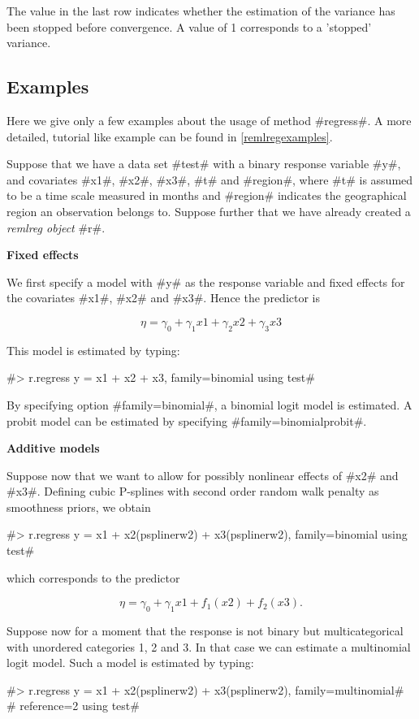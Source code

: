 The value in the last row indicates whether the estimation of the
variance has been stopped before convergence. A value of 1
corresponds to a 'stopped' variance.

\subsection{Examples}

Here we give only a few examples about the usage of method
#regress#. A more detailed, tutorial like example can be found in
\autoref{remlregexamples}.

Suppose that we have a data set #test# with a binary response
variable #y#, and covariates #x1#, #x2#, #x3#, #t# and #region#,
where #t# is assumed to be a time scale measured in months and
#region# indicates the geographical region an observation belongs
to. Suppose further that we have already created a {\em remlreg
object} #r#.

{\bf  Fixed effects}
\medskip

We first specify a model with #y# as the response variable and
fixed effects for the covariates #x1#, #x2# and #x3#. Hence the
predictor is

$$
\eta = \gamma_0 + \gamma_1 x1 + \gamma_2 x2 + \gamma_3 x3
$$

This model is estimated by typing:

#> r.regress y = x1 + x2 + x3, family=binomial using test#

By specifying option #family=binomial#, a binomial logit model is
estimated. A probit model can be estimated by specifying
#family=binomialprobit#.

{\bf Additive models}
\medskip

Suppose now that we want to allow for possibly nonlinear effects
of #x2# and #x3#. Defining cubic P-splines with second order
random walk penalty as smoothness priors, we obtain

 #> r.regress y = x1 + x2(psplinerw2) + x3(psplinerw2), family=binomial using test#

which corresponds to the predictor

$$
\eta = \gamma_0 + \gamma_1 x1 + f_1(x2) + f_2(x3).
$$

Suppose now for a moment that the response is not binary but
multicategorical with unordered categories 1, 2 and 3. In that
case we can estimate a multinomial logit model. Such a model is
estimated by typing:

 #> r.regress y = x1 + x2(psplinerw2) + x3(psplinerw2), family=multinomial#\\
 #  reference=2 using test#


